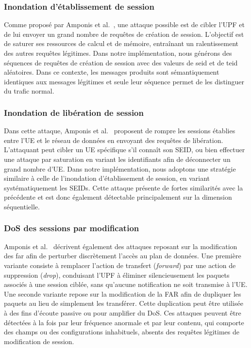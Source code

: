 \documentclass[a4paper,11pt,twoside]{StyleThese}
\begin{document}
\subsubsection{Inondation d'établissement de session}
Comme proposé par Amponis et al.~\cite{amponis20235g}, une attaque possible est de cibler l’UPF et de lui envoyer un grand nombre de requêtes de création de session. L’objectif est de saturer ses ressources de calcul et de mémoire, entraînant un ralentissement des autres requêtes légitimes. Dans notre implémentation, nous générons des séquences de requêtes de création de session avec des valeurs de \gls{seid} et de \gls{teid} aléatoires. Dans ce contexte, les messages produits sont sémantiquement identiques aux messages légitimes et seule leur séquence permet de les distinguer du trafic normal.

\subsubsection{Inondation de libération de session}
Dans cette attaque, Amponis et al.~\cite{amponis20235g} proposent de rompre les sessions établies entre l’UE et le réseau de données en envoyant des requêtes de libération. L’attaquant peut cibler un UE spécifique s’il connaît son SEID, ou bien effectuer une attaque par saturation en variant les identifiants afin de déconnecter un grand nombre d’UE. Dans notre implémentation, nous adoptons une stratégie similaire à celle de l'inondation d'établissement de session, en variant systématiquement les SEIDs. Cette attaque présente de fortes similarités avec la précédente et est donc également détectable principalement sur la dimension séquentielle.

\subsubsection{DoS des sessions par modification}
Amponis et al.~\cite{amponis20235g} décrivent également des attaques reposant sur la modification des \gls{far} afin de perturber discrètement l’accès au plan de données. Une première variante consiste à remplacer l’action de transfert (\textit{forward}) par une action de suppression (\textit{drop}), conduisant l’UPF à éliminer silencieusement les paquets associés à une session ciblée, sans qu’aucune notification ne soit transmise à l’UE. Une seconde variante repose sur la modification de la FAR afin de dupliquer les paquets au lieu de simplement les transférer. Cette duplication peut être utilisée à des fins d’écoute passive ou pour amplifier du DoS. Ces attaques peuvent être détectées à la fois par leur fréquence anormale et par leur contenu, qui comporte des champs ou des configurations inhabituels, absents des requêtes légitimes de modification de session.
\end{document}
